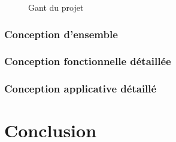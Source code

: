 \begin{figure}[H]
\noindent{}
\caption{Gant du projet}
\end{figure}

\subsubsection*{Conception d'ensemble}
\subsubsection*{Conception fonctionnelle détaillée}
\subsubsection*{Conception applicative détaillé}

\section*{Conclusion}
\restoregeometry